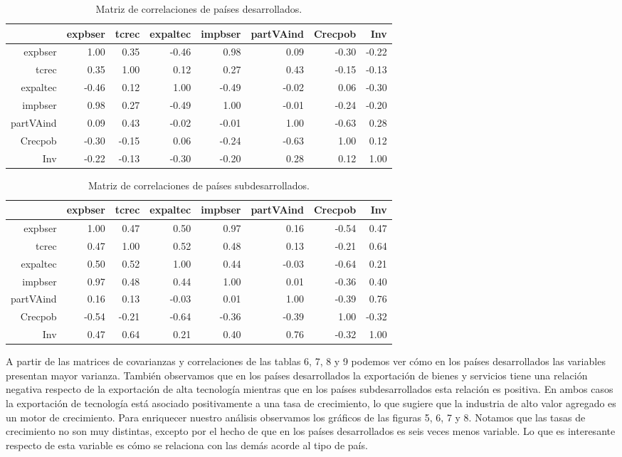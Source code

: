 \documentclass[a4paper,10pt]{article}
\begin{document}
\begin{table}[ht]
\centering
\begin{tabular}{rrrrrrrr}
  \hline
 & expbser & tcrec & expaltec & impbser & partVAind & Crecpob & Inv \\ 
  \hline
expbser & 1.00 & 0.35 & -0.46 & 0.98 & 0.09 & -0.30 & -0.22 \\ 
  tcrec & 0.35 & 1.00 & 0.12 & 0.27 & 0.43 & -0.15 & -0.13 \\ 
  expaltec & -0.46 & 0.12 & 1.00 & -0.49 & -0.02 & 0.06 & -0.30 \\ 
  impbser & 0.98 & 0.27 & -0.49 & 1.00 & -0.01 & -0.24 & -0.20 \\ 
  partVAind & 0.09 & 0.43 & -0.02 & -0.01 & 1.00 & -0.63 & 0.28 \\ 
  Crecpob & -0.30 & -0.15 & 0.06 & -0.24 & -0.63 & 1.00 & 0.12 \\ 
  Inv & -0.22 & -0.13 & -0.30 & -0.20 & 0.28 & 0.12 & 1.00 \\ 
   \hline
\end{tabular}
\caption{Matriz de correlaciones de países desarrollados.}
\end{table}

\begin{table}[ht]
\centering
\begin{tabular}{rrrrrrrr}
  \hline
 & expbser & tcrec & expaltec & impbser & partVAind & Crecpob & Inv \\ 
  \hline
expbser & 1.00 & 0.47 & 0.50 & 0.97 & 0.16 & -0.54 & 0.47 \\ 
  tcrec & 0.47 & 1.00 & 0.52 & 0.48 & 0.13 & -0.21 & 0.64 \\ 
  expaltec & 0.50 & 0.52 & 1.00 & 0.44 & -0.03 & -0.64 & 0.21 \\ 
  impbser & 0.97 & 0.48 & 0.44 & 1.00 & 0.01 & -0.36 & 0.40 \\ 
  partVAind & 0.16 & 0.13 & -0.03 & 0.01 & 1.00 & -0.39 & 0.76 \\ 
  Crecpob & -0.54 & -0.21 & -0.64 & -0.36 & -0.39 & 1.00 & -0.32 \\ 
  Inv & 0.47 & 0.64 & 0.21 & 0.40 & 0.76 & -0.32 & 1.00 \\ 
   \hline
\end{tabular}
\caption{Matriz de correlaciones de países subdesarrollados.}
\end{table}

A partir de las matrices de covarianzas y correlaciones de las tablas 6, 7, 8 y 9 podemos ver cómo en los países desarrollados las variables presentan
mayor varianza. También observamos que en los países desarrollados la exportación de bienes y servicios tiene una relación negativa respecto de la 
exportación de alta tecnología mientras que en los países subdesarrollados esta relación es positiva. En ambos casos la exportación de tecnología está 
asociado positivamente a una tasa de crecimiento, lo que sugiere que la industria de alto valor agregado es un motor de crecimiento.
Para enriquecer nuestro análisis observamos los gráficos de las figuras 5, 6, 7 y 8. Notamos que las tasas de crecimiento no son muy distintas, excepto por
el hecho de que en los países desarrollados es seis veces menos variable. Lo que es interesante respecto de esta variable es cómo se relaciona con las 
demás acorde al tipo de país.
\end{document}
